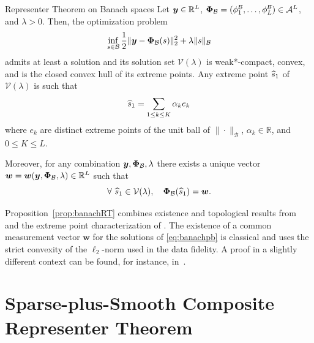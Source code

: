 \documentclass[12pt]{article}
\begin{document}
    \begin{proposition}{Representer Theorem on Banach spaces}
    \label{prop:banachRT}
     Let $\bm{y}\in \mathbb{R}^L$, ${\bm{\Phi}_\mathcal{B}}= (\phi^\mathcal{B}_1 ,\ldots , \phi^\mathcal{B}_L) \in \mathcal{A}^L$, and $\lambda > 0$. Then, the optimization problem 
    \begin{equation} \label{eq:banachpb}
        \inf_{s \in \mathcal{B}} \frac{1}{2} \| \bm{y} - {\bm{\Phi}_\mathcal{B}}(s) \|_2^2 + \lambda \| s \|_{\mathcal{B}}
    \end{equation}
    admits at least a solution and its solution set $\mathcal{V} (\lambda)$ is weak*-compact, convex, and is the closed convex hull of its extreme points. Any extreme point $\widehat{s}_1$ of $\mathcal{V} (\lambda)$ is such that 
    \begin{equation} \label{eq:widehatbanachextreme}
        \widehat{s}_1  = \sum_{1 \leq k \leq K} \alpha_k e_k
    \end{equation}
    where $e_k$ are distinct extreme points of the unit ball of $\|\cdot \|_{\mathcal{B}}$,  $\alpha_k \in \mathbb{R}$, and $0 \leq K \leq L$.

    Moreover, for any combination $\bm{y}, {\bm{\Phi}_\mathcal{B}},\lambda$ there exists a unique vector $\bm{w} = \bm{w}(\bm{y}, {\bm{\Phi}_\mathcal{B}},\lambda) \in \mathbb{R}^L$ such that
    \begin{equation} \label{eq:zlambda}
        \forall\ \widehat{s}_1 \in \mathcal{V} (\lambda), \quad {\bm{\Phi}_\mathcal{B}}(\widehat{s}_1) = \bm{w}.
    \end{equation}
    \end{proposition}
    
    Proposition~\ref{prop:banachRT} combines existence and topological results from~\cite[Proposition 8]{gupta2018continuous} and the extreme point characterization of \cite[Theorem 3.1]{boyer2019representer}.
    The existence of a common measurement vector $\bm{w}$ for the solutions of \eqref{eq:banachpb} is classical and uses the strict convexity of the $\ell_2$-norm used in the data fidelity. A proof in a slightly different context can be found, for instance, in~\cite[Proposition 7]{debarre2022sparsest}.


\section{Sparse-plus-Smooth Composite Representer Theorem}
\end{document}
